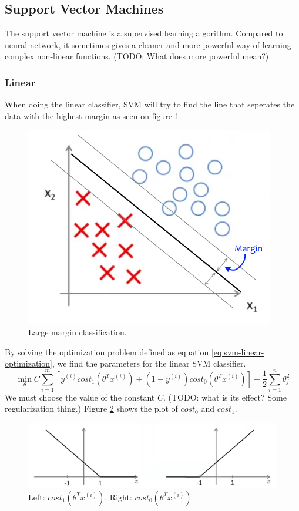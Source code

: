 
\subsection{Support Vector Machines}
The support vector machine is a supervised learning algorithm.
Compared to neural network, it sometimes gives a cleaner and more powerful way of learning complex non-linear functions. (TODO: What does more powerful mean?)

\subsubsection{Linear}
When doing the linear classifier, SVM will try to find the line that seperates the data with the highest margin as seen on figure \ref{fig:svm-margin}.

\begin{figure}[H]
\centering
\includegraphics[scale=.75]{billeder/svm-margin}
\caption{Large margin classification.}
\label{fig:svm-margin}
\end{figure}

By solving the optimization problem defined as equation \ref{eq:svm-linear-optimization}, we find the parameters for the linear SVM classifier.
\begin{equation}
\min_{\theta}C \sum_{i=1}^{m}
\left[ y^{(i)}cost_1(\theta^Tx^{(i)})+(1-y^{(i)})cost_0(\theta^Tx^{(i)}) \right]
+ \frac{1}{2}\sum_{i=1}^{n}\theta^2_j
\label{eq:svm-linear-optimization}
\end{equation}
We must choose the value of the constant $C$. (TODO: what is its effect? Some regularization thing.)
Figure \ref{fig:svm-cost-function} shows the plot of $cost_0$ and $cost_1$.
\begin{figure}[H]
\centering
\includegraphics[scale=.75]{billeder/svm-cost-function}
\caption{Left: $cost_1(\theta^Tx^{(i)})$. Right: $cost_0(\theta^Tx^{(i)})$}
\label{fig:svm-cost-function}
\end{figure}

